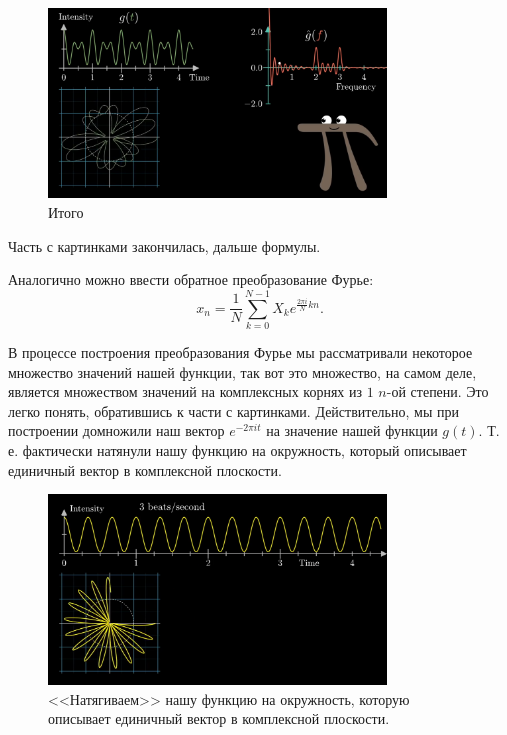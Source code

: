 \begin{figure}[H]    
  \centering    
  \includegraphics[width=0.8\textwidth]{figures/dft8.png}    
  \caption*{Итого}        
\end{figure} 

Часть с картинками закончилась, дальше формулы.

Аналогично можно ввести обратное преобразование Фурье:
\[
  x_{n} = \frac{1}{N} \sum_{k=0}^{N - 1} X_{k} e^{\frac{2\pi i}{N} kn}
.\] 

В процессе построения преобразования Фурье мы рассматривали некоторое множество значений нашей функции, так
вот это множество, на самом деле, является множеством значений на комплексных корнях из $1$ $n$-ой степени.
Это легко понять, обратившись к части с картинками. Действительно, мы при построении домножили наш
вектор $e^{-2\pi i t}$ на значение нашей функции $g(t)$. Т. е. фактически натянули нашу функцию 
на окружность, который описывает единичный вектор в комплексной плоскости.

\begin{figure}[H]    
  \centering    
  \includegraphics[width=0.8\textwidth]{figures/dft9.png}    
  \caption*{<<Натягиваем>> нашу функцию на окружность, которую описывает единичный вектор в комплексной
  плоскости.}        
\end{figure} 

